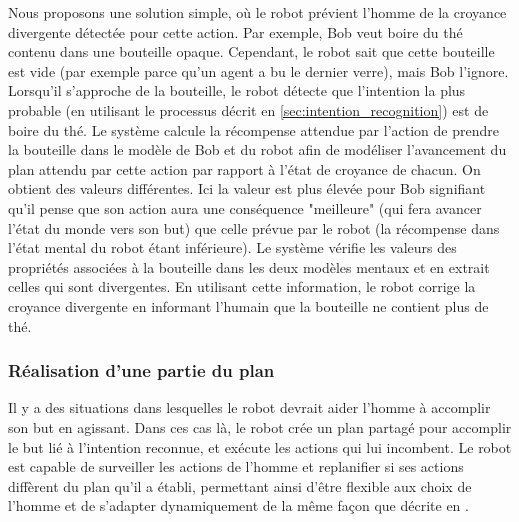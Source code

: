\documentclass[a4paper,11pt,twoside]{StyleThese}
\begin{document}
Nous proposons une solution simple, où le robot prévient l'homme de la croyance divergente détectée pour cette action. Par exemple, Bob veut boire du thé contenu dans une bouteille opaque. Cependant, le robot sait que cette bouteille est vide (par exemple parce qu'un agent a bu le dernier verre), mais Bob l'ignore. Lorsqu'il s'approche de la bouteille, le robot détecte que l'intention la plus probable (en utilisant le processus décrit en \ref{sec:intention_recognition}) est de boire du thé. Le système calcule la récompense attendue par l'action de prendre la bouteille dans le modèle de Bob et du robot afin de modéliser l'avancement du plan attendu par cette action par rapport à l'état de croyance de chacun. On obtient des valeurs différentes. Ici la valeur est plus élevée pour Bob signifiant qu'il pense que son action aura une conséquence "meilleure" (qui fera avancer l'état du monde vers son but) que celle prévue par le robot (la récompense dans l'état mental du robot étant inférieure). Le système vérifie les valeurs des propriétés associées à la bouteille dans les deux modèles mentaux et en extrait celles qui sont divergentes. En utilisant cette information, le robot corrige la croyance divergente en informant l'humain que la bouteille ne contient plus de thé.


\subsubsection{Réalisation d'une partie du plan}
\label{robot_acts}
Il y a des situations dans lesquelles le robot devrait aider l'homme à accomplir son but en agissant. Dans ces cas là, le robot crée un plan partagé pour accomplir le but lié à l'intention reconnue, et exécute les actions qui lui incombent. Le robot est capable de surveiller les actions de l'homme et replanifier si ses actions diffèrent du plan qu'il a établi, permettant ainsi d'être flexible aux choix de l'homme et de s'adapter dynamiquement de la même façon que décrite en \cite{fioreiser2014}.
\vspace{-5pt}
\end{document}
